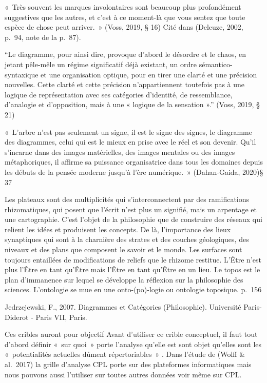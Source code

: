 \documentclass[
  letterpaper,
  DIV=11,
  numbers=noendperiod]{scrreprt}
\begin{document}
«~Très souvent les marques involontaires sont beaucoup plus profondément
suggestives que les autres, et c'est à ce moment-là que vous sentez que
toute espèce de chose peut arriver.~» (Voss, 2019, § 16) Cité dans
(Deleuze, 2002, p.~94, note de la p.~87).

``Le diagramme, pour ainsi dire, provoque d'abord le désordre et le
chaos, en jetant pêle-mêle un régime significatif déjà existant, un
ordre sémantico-syntaxique et une organisation optique, pour en tirer
une clarté et une précision nouvelles. Cette clarté et cette précision
n'appartiennent toutefois pas à une logique de représentation avec ses
catégories d'identité, de ressemblance, d'analogie et d'opposition, mais
à une « logique de la sensation ».'' (Voss, 2019, § 21)

«~L'arbre n'est pas seulement un signe, il est le signe des signes, le
diagramme des diagrammes, celui qui est le mieux en prise avec le réel
et son devenir. Qu'il s'incarne dans des images matérielles, des images
mentales ou des images métaphoriques, il affirme sa puissance
organisatrice dans tous les domaines depuis les débuts de la pensée
moderne jusqu'à l'ère numérique.~» (Dahan-Gaida, 2020)§ 37

Les plateaux sont des multiplicités qui s'interconnectent par des
ramifications rhizomatiques, qui posent que l'écrit n'est plus un
signifié, mais un arpentage et une cartographie. C'est l'objet de la
philosophie que de construire des réseaux qui relient les idées et
produisent les concepts. De là, l'importance des lieux synaptiques qui
sont à la charnière des strates et des couches géologiques, des niveaux
et des plans que composent le savoir et le monde. Les surfaces sont
toujours entaillées de modifications de reliefs que le rhizome restitue.
L'Être n'est plus l'Être en tant qu'Être mais l'Être en tant qu'Être en
un lieu. Le topos est le plan d'immanence sur lequel se développe la
réflexion sur la philosophie des sciences. L'ontologie se mue en une
onto-(po)-logie ou ontologie toposique. p.~156

Jedrzejewski, F., 2007. Diagrammes et Catégories (Philosophie).
Université Paris-Diderot - Paris VII, Paris.

Ces cribles auront pour objectif Avant d'utiliser ce crible conceptuel,
il faut tout d'abord définir «~sur quoi~» porte l'analyse qu'elle est
sont objet qu'elles sont les «~potentialités actuelles dûment
répertoriables~» . Dans l'étude de (Wolff \& al.~2017) la grille
d'analyse CPL porte sur des plateformes informatiques mais nous pouvons
aussi l'utiliser sur toutes autres données voir même sur CPL.
\end{document}

